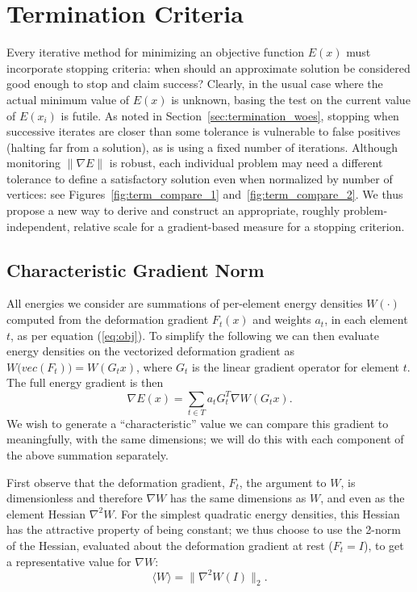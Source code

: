 \section{Termination Criteria}
\label{sec:term}

Every iterative method for minimizing an objective function $E(x)$
must incorporate stopping criteria: when should an approximate
solution be considered good enough to stop and claim success?
Clearly, in the usual case where the actual minimum value of $E(x)$
is unknown, basing the test on the current value of $E(x_i)$ is
futile. As noted in Section~\ref{sec:termination_woes},
stopping when successive iterates are closer than some tolerance is
vulnerable to false positives (halting far from a solution), as is
using a fixed number of iterations. Although monitoring $\|\nabla E\|$
is robust, each individual problem may need a different tolerance to
define a satisfactory solution even when normalized by number of vertices:
see Figures\ \ref{fig:term_compare_1} and\ \ref{fig:term_compare_2}.
We thus propose a new way to derive and construct an appropriate,
roughly problem-independent, relative scale for a gradient-based
measure for a stopping criterion.

\subsection{Characteristic Gradient Norm}

All energies we consider are summations of per-element energy densities $W(\cdot)$ computed
from the deformation gradient $F_t(x)$ and weights $a_t$, in each element $t$, as per equation (\ref{eq:obj}). 
To simplify the following we can then evaluate energy densities on
the vectorized deformation gradient as $W\big(vec(F_t)\big) =  W(G_t
x)$, where $G_t$ is the linear gradient operator for element $t$.
The full energy gradient is then
\begin{equation}
    \nabla E(x) = \sum_{t \in T} a_t  G_t^T \nabla W(G_t x).
\end{equation}
We wish to generate a ``characteristic'' value we can compare this gradient to meaningfully, with the same
dimensions; we will do this with each component of the above summation separately.

First observe that the deformation gradient, $F_t$, the argument to $W$, is dimensionless and therefore
$\nabla W$ has the same dimensions as $W$, and even as the element Hessian $\nabla^2 W$. For the simplest
quadratic energy densities, this Hessian has the attractive property of being constant; we thus choose
to use the 2-norm of the Hessian, evaluated about the deformation gradient at rest ($F_t=I$), to get
a representative value for $\nabla W$:
\begin{equation}
    \langle W \rangle = \|\nabla^2 W(I)\|_2.
\end{equation}

